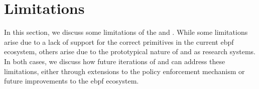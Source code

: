 


\section{Limitations}%
\label{s:disc-limitations}

In this section, we discuss some limitations of the \bpfbox{} and \bpfcontain{}.  While
some limitations arise due to a lack of support for the correct primitives in the current
\gls{ebpf} ecosystem, others arise due to the prototypical nature of \bpfbox{} and
\bpfcontain{} as research systems. In both cases, we discuss how future iterations of
\bpfbox{} and \bpfcontain{} can address these limitations, either through extensions to
the policy enforcement mechanism or future improvements to the \gls{ebpf} ecosystem.

